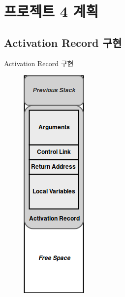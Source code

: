 \documentclass{bredelebeamer}
\begin{document}
\section{프로젝트 4 계획}
\subsection{Activation Record 구현}
\begin{frame}{Activation Record 구현}
	\begin{figure}
		\includegraphics[scale=0.4]{figure/activation_record.png}
	\end{figure}
\end{frame}
\end{document}
